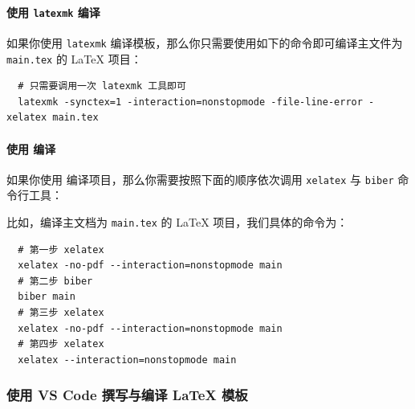 \paragraph{使用 \texttt{latexmk} 编译}

如果你使用 \texttt{latexmk} 编译模板，那么你只需要使用如下的命令即可编译主文件为 \texttt{main.tex} 的 {\LaTeX} 项目：

\begin{verbatim}
  # 只需要调用一次 latexmk 工具即可
  latexmk -synctex=1 -interaction=nonstopmode -file-line-error -xelatex main.tex
\end{verbatim}


\paragraph{使用  编译}

如果你使用  编译项目，那么你需要按照下面的顺序依次调用 \texttt{xelatex} 与 \texttt{biber} 命令行工具：

\begin{center}
\end{center}

比如，编译主文档为 \texttt{main.tex} 的 {\LaTeX} 项目，我们具体的命令为：

\begin{verbatim}
  # 第一步 xelatex
  xelatex -no-pdf --interaction=nonstopmode main
  # 第二步 biber
  biber main
  # 第三步 xelatex
  xelatex -no-pdf --interaction=nonstopmode main
  # 第四步 xelatex
  xelatex --interaction=nonstopmode main
\end{verbatim}

\subsubsection{使用 VS Code 撰写与编译 {\LaTeX} 模板}

